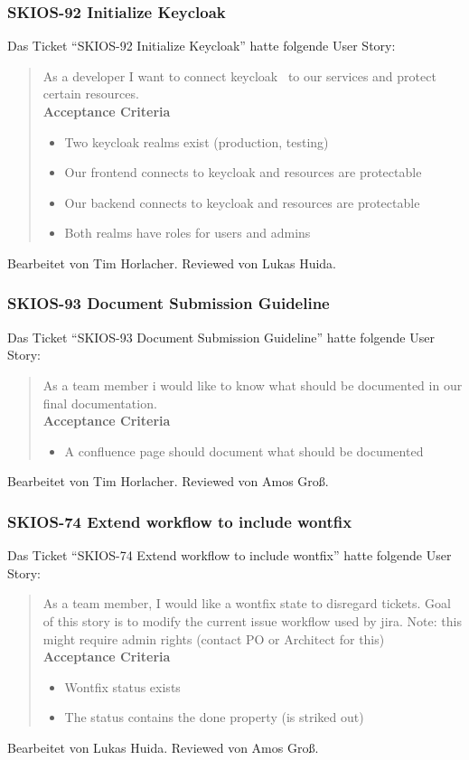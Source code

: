 \subsubsection{SKIOS-92 Initialize Keycloak}
Das Ticket \enquote{SKIOS-92 Initialize Keycloak} hatte folgende User Story:
\begin{quotation}
    As a developer I want to connect keycloak~\parencite{web/Keycloak} to our services and protect certain resources. \\
    \textbf{Acceptance Criteria}
    \begin{itemize}
        \item Two keycloak realms exist (production, testing)
        \item Our frontend connects to keycloak and resources are protectable
        \item Our backend connects to keycloak and resources are protectable
        \item Both realms have roles for users and admins
    \end{itemize}
\end{quotation}
Bearbeitet von Tim Horlacher.
Reviewed von Lukas Huida.

\subsubsection{SKIOS-93 Document Submission Guideline}
Das Ticket \enquote{SKIOS-93 Document Submission Guideline} hatte folgende User Story:
\begin{quotation}
    As a team member i would like to know what should be documented in our final documentation. \\
    \textbf{Acceptance Criteria}
    \begin{itemize}
        \item A confluence page should document what should be documented
    \end{itemize}
\end{quotation}
Bearbeitet von Tim Horlacher.
Reviewed von Amos Groß.

\subsubsection{SKIOS-74 Extend workflow to include wontfix}
Das Ticket \enquote{SKIOS-74 Extend workflow to include wontfix} hatte folgende User Story:
\begin{quotation}
    As a team member, I would like a wontfix state to disregard tickets.
    Goal of this story is to modify the current issue workflow used by jira.
    Note: this might require admin rights (contact PO or Architect for this) \\
    \textbf{Acceptance Criteria}
    \begin{itemize}
        \item Wontfix status exists
        \item The status contains the done property (is striked out)
    \end{itemize}
\end{quotation}
Bearbeitet von Lukas Huida.
Reviewed von Amos Groß.

